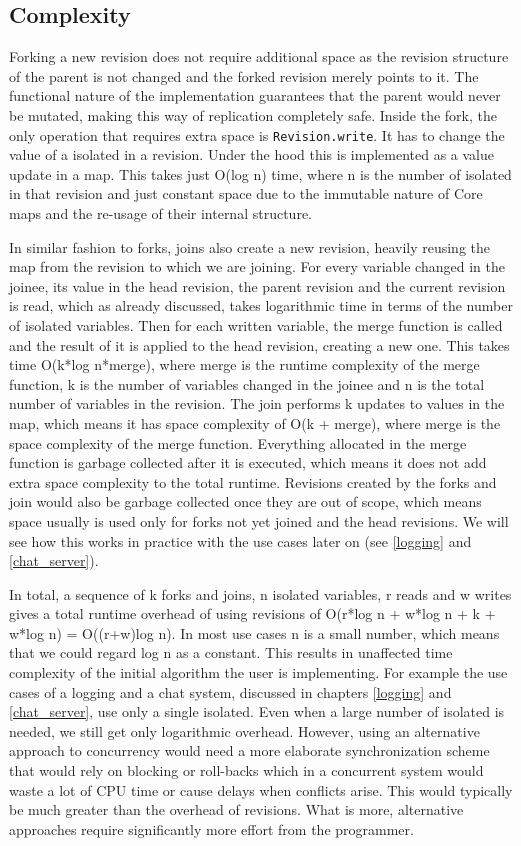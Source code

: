 \documentclass[12pt,twoside,notitlepage]{report}
\begin{document}
{\subsection{Complexity}
\label{complexity}
Forking a new revision does not require additional space as the revision structure of the parent is not changed and the forked revision merely points to it. The functional nature of the implementation guarantees that the parent would never be mutated, making this way of replication completely safe. Inside the fork, the only operation that requires extra space is {\tt Revision.write}. It has to change the value of a isolated in a revision. Under the hood this is implemented as a value update in a map. This takes just O(log n) time, where n is the number of isolated in that revision and just constant space due to the immutable nature of Core maps and the re-usage of their internal structure. 

In similar fashion to forks, joins also create a new revision, heavily reusing the map from the revision to which we are joining. For every variable changed in the joinee, its value in the head revision, the parent revision and the current revision is read, which as already discussed, takes logarithmic time in terms of the number of isolated variables. Then for each written variable, the merge function is called and the result of it is applied to the head revision, creating a new one. This takes time O(k*log n*merge), where merge is the runtime complexity of the merge function, k is the number of variables changed in the joinee and n is the total number of variables in the revision. The join performs k updates to values in the map, which means it has space complexity of O(k + merge), where merge is the space complexity of the merge function. Everything allocated in the merge function is garbage collected after it is executed, which means it does not add extra space complexity to the total runtime. Revisions created by the forks and join would also be garbage collected once they are out of scope, which means space usually is used only for forks not yet joined and the head revisions. We will see how this works in practice with the use cases later on (see \ref{logging} and \ref{chat_server}). 

In total, a sequence of k forks and joins, n isolated variables, r reads and w writes gives a total runtime overhead of using revisions of O(r*log n + w*log n + k + w*log n) = O((r+w)log n). In most use cases n is a small number, which means that we could regard log n as a constant. This results in unaffected time complexity of the initial algorithm the user is implementing. For example the use cases of a logging and a chat system, discussed in chapters \ref{logging} and \ref{chat_server}, use only a single isolated. Even when a large number of isolated is needed, we still get only logarithmic overhead. However, using an alternative approach to concurrency would need a more elaborate synchronization scheme that would rely on blocking or roll-backs which in a concurrent system would waste a lot of CPU time or cause delays when conflicts arise. This would typically be much greater than the overhead of revisions. What is more, alternative approaches require significantly more effort from the programmer.

}
\end{document}
